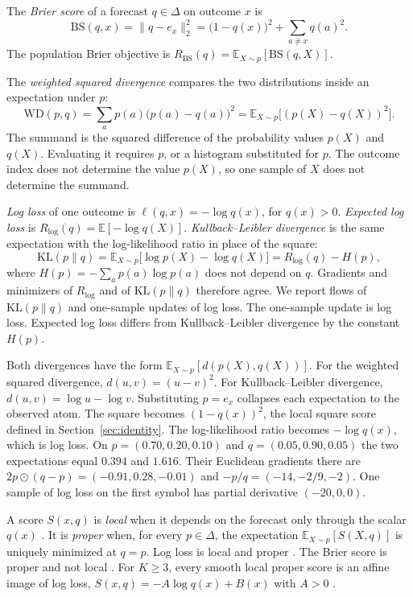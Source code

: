 \documentclass[10pt]{article}
\newcommand{\BS}{\mathrm{BS}}
\newcommand{\WD}{\mathrm{WD}}
\newcommand{\KL}{\mathrm{KL}}
\begin{document}
The \emph{Brier score} of a forecast $q\in\Delta$ on outcome $x$ is
\begin{equation}
\label{eq:brier}
\BS(q,x) = \|q-e_x\|_2^2 = \bigl(1-q(x)\bigr)^2 + \sum_{a\neq x} q(a)^2.
\end{equation}
The population Brier objective is $R_{\BS}(q)=\mathbb{E}_{X\sim p}[\BS(q,X)]$.

The \emph{weighted squared divergence} compares the two distributions inside an expectation under $p$:
\begin{equation}
\label{eq:wd}
\WD(p,q)
= \sum_a p(a)\bigl(p(a)-q(a)\bigr)^2
= \mathbb{E}_{X\sim p}\bigl[(p(X)-q(X))^2\bigr].
\end{equation}
The summand is the squared difference of the probability values $p(X)$ and $q(X)$.
Evaluating it requires $p$, or a histogram substituted for $p$.
The outcome index does not determine the value $p(X)$, so one sample of $X$ does not determine the summand.

\emph{Log loss} of one outcome is $\ell(q,x)=-\log q(x)$, for $q(x)>0$.
\emph{Expected log loss} is $R_{\log}(q)=\mathbb{E}[-\log q(X)]$.
\emph{Kullback--Leibler divergence} is the same expectation with the log-likelihood ratio in place of the square:
\begin{equation}
\label{eq:kl}
\KL(p\|q)
= \mathbb{E}_{X\sim p}\bigl[\log p(X)-\log q(X)\bigr]
= R_{\log}(q) - H(p),
\end{equation}
where $H(p)=-\sum_a p(a)\log p(a)$ does not depend on $q$.
Gradients and minimizers of $R_{\log}$ and of $\KL(p\|q)$ therefore agree.
We report flows of $\KL(p\|q)$ and one-sample updates of log loss.
The one-sample update is log loss.
Expected log loss differs from Kullback--Leibler divergence by the constant $H(p)$.

Both divergences have the form $\mathbb{E}_{X\sim p}[d(p(X),q(X))]$.
For the weighted squared divergence, $d(u,v)=(u-v)^2$.
For Kullback--Leibler divergence, $d(u,v)=\log u-\log v$.
Substituting $p=e_x$ collapses each expectation to the observed atom.
The square becomes $(1-q(x))^2$, the local square score defined in Section~\ref{sec:identity}.
The log-likelihood ratio becomes $-\log q(x)$, which is log loss.
On $p=(0.70,0.20,0.10)$ and $q=(0.05,0.90,0.05)$ the two expectations equal $0.394$ and $1.616$.
Their Euclidean gradients there are $2p\odot(q-p)=(-0.91,0.28,-0.01)$ and $-p/q=(-14,-2/9,-2)$.
One sample of log loss on the first symbol has partial derivative $(-20,0,0)$.

A score $S(x,q)$ is \emph{local} when it depends on the forecast only through the scalar $q(x)$ \citep{mit67800}.
It is \emph{proper} when, for every $p\in\Delta$, the expectation $\mathbb{E}_{X\sim p}[S(X,q)]$ is uniquely minimized at $q=p$.
Log loss is local and proper \citep{good1952,bernardo1979}.
The Brier score is proper and not local \citep{brier1950,gneiting2007}.
For $K\ge 3$, every smooth local proper score is an affine image of log loss, $S(x,q)=-A\log q(x)+B(x)$ with $A>0$ \citep{bernardo1979,mit67800}.
\end{document}
